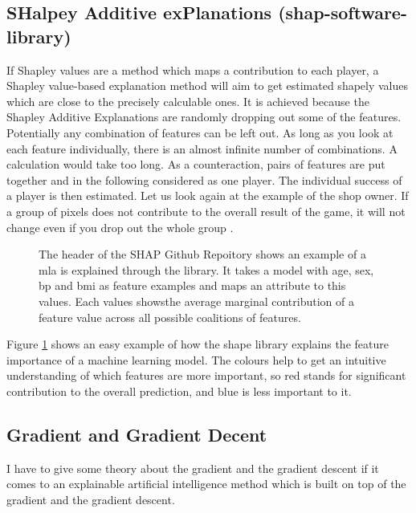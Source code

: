\subsection*{SHalpey Additive exPlanations (shap-software-library)}
If Shapley values are a method which maps a contribution to each player, a Shapley value-based explanation method will aim to get estimated shapely values which are close to the precisely calculable ones. It is achieved because the Shapley Additive Explanations are randomly dropping out some of the features. Potentially any combination of features can be left out. As long as you look at each feature individually, there is an almost infinite number of combinations. A calculation would take too long. As a counteraction, pairs of features are put together and in the following considered as one player. The individual success of a player is then estimated. Let us look again at the example of the shop owner. If a group of pixels does not contribute to the overall result of the game, it will not change even if you drop out the whole group \cite{ScottM} \cite{molnar2019} \cite{Lundberg}.\\

\begin{figure}[!htp]
	\centering
	\caption{The header of the SHAP Github Repoitory shows an example of a \gls{mla} is explained through the library. It takes a model with age, sex, bp and bmi as feature examples and maps an attribute to this values. Each values showsthe average marginal contribution of a feature value across all possible coalitions of features.}
	\label{fig:shap_library_example}
\end{figure}

Figure \ref{fig:shap_library_example} shows an easy example of how the shape library explains the feature importance of a machine learning model. The colours help to get an intuitive understanding of which features are more important, so red stands for significant contribution to the overall prediction, and blue is less important to it. 

\subsection*{Gradient and Gradient Decent}
\label{sec:gd}
I have to give some theory about the gradient and the gradient descent if it comes to an explainable artificial intelligence method which is built on top of the gradient and the gradient descent.\\


